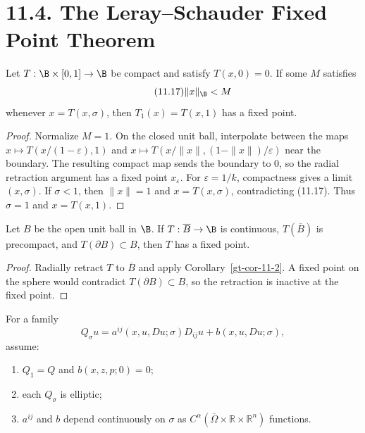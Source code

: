 \section*{11.4. The Leray--Schauder Fixed Point Theorem}

\begin{theorem}
\label{gt-thm-11-6}
Let $T:\B\times[0,1]\to\B$ be compact and satisfy $T(x,0)=0$. If some
$M$ satisfies
\begin{equation}
\tag{11.17}
\|x\|_{\B}<M
\end{equation}
whenever $x=T(x,\sigma)$, then $T_1(x)=T(x,1)$ has a fixed point.
\end{theorem}
\begin{proof}
\sketch Normalize $M=1$. On the closed unit ball, interpolate between the
maps $x\mapsto T(x/(1-\varepsilon),1)$ and
$x\mapsto T(x/\|x\|,(1-\|x\|)/\varepsilon)$ near the boundary. The resulting
compact map sends the boundary to $0$, so the radial retraction argument has
a fixed point $x_\varepsilon$. For $\varepsilon=1/k$, compactness gives a
limit $(x,\sigma)$. If $\sigma<1$, then $\|x\|=1$ and
$x=T(x,\sigma)$, contradicting (11.17). Thus $\sigma=1$ and $x=T(x,1)$.
\end{proof}

\begin{lemma}
\label{gt-lem-11-7}
Let $B$ be the open unit ball in $\B$. If
$T:\overline B\to\B$ is continuous, $T(\overline B)$ is precompact, and
$T(\partial B)\subset B$, then $T$ has a fixed point.
\end{lemma}
\begin{proof}
\sketch Radially retract $T$ to $\overline B$ and apply
Corollary~\ref{gt-cor-11-2}. A fixed point on the sphere would contradict
$T(\partial B)\subset B$, so the retraction is inactive at the fixed point.
\end{proof}

For a family
\[
Q_\sigma u=a^{ij}(x,u,Du;\sigma)D_{ij}u+b(x,u,Du;\sigma),
\]
assume:
\begin{enumerate}
\item $Q_1=Q$ and $b(x,z,p;0)=0$;
\item each $Q_\sigma$ is elliptic;
\item $a^{ij}$ and $b$ depend continuously on $\sigma$ as
$C^\alpha(\overline\Omega\times\mathbb R\times\mathbb R^n)$ functions.
\end{enumerate}

